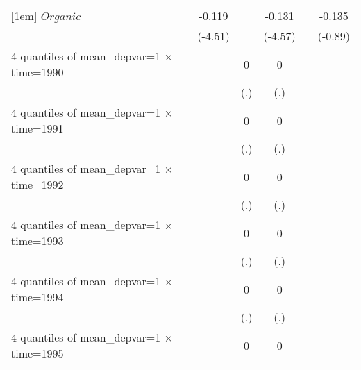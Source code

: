 \begin{table}[htbp]
\begin{tabular}{l*{6}{c}}
[1em]
$ Organic $         &                     &      -0.119\sym{***}&                     &      -0.131\sym{***}&                     &      -0.135         \\
                    &                     &     (-4.51)         &                     &     (-4.57)         &                     &     (-0.89)         \\
[1em]
4 quantiles of mean\_depvar=1 $\times$ time=1990&                     &                     &           0         &           0         &                     &                     \\
                    &                     &                     &         (.)         &         (.)         &                     &                     \\
[1em]
4 quantiles of mean\_depvar=1 $\times$ time=1991&                     &                     &           0         &           0         &                     &                     \\
                    &                     &                     &         (.)         &         (.)         &                     &                     \\
[1em]
4 quantiles of mean\_depvar=1 $\times$ time=1992&                     &                     &           0         &           0         &                     &                     \\
                    &                     &                     &         (.)         &         (.)         &                     &                     \\
[1em]
4 quantiles of mean\_depvar=1 $\times$ time=1993&                     &                     &           0         &           0         &                     &                     \\
                    &                     &                     &         (.)         &         (.)         &                     &                     \\
[1em]
4 quantiles of mean\_depvar=1 $\times$ time=1994&                     &                     &           0         &           0         &                     &                     \\
                    &                     &                     &         (.)         &         (.)         &                     &                     \\
[1em]
4 quantiles of mean\_depvar=1 $\times$ time=1995&                     &                     &           0         &           0         &                     &                     \\

\end{tabular}
\end{table}

